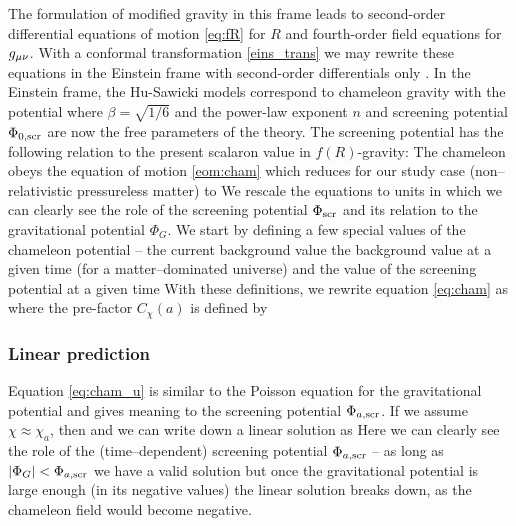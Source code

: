 The formulation of modified gravity in this frame leads to second-order differential equations of motion \eqref{eq:fR} for $R$ and fourth-order field equations for $g_{\mu\nu}$. With a conformal transformation \eqref{eins_trans} we may rewrite these equations in the Einstein frame with second-order differentials only \parencite[see, e.g.,][]{CHIBA20031}. In the Einstein frame, the Hu-Sawicki models correspond to chameleon gravity with the potential
where $\beta=\sqrt{1/6}$ and the power-law exponent $n$ and screening potential $\Phi_{0,\text{\scriptsize scr}}$ are now the free parameters of the theory. The screening potential has the following relation to the present scalaron value in $f(R)$-gravity:
The chameleon obeys the equation of motion \eqref{eom:cham} which reduces for our study case (non--relativistic pressureless matter) to
We rescale the equations to units in which we can clearly see the role of the screening potential $\Phi_{\text{\scriptsize scr}}$ and its relation to the gravitational potential $\Phi_G$. We start by defining a few special values of the chameleon potential -- the current background value
the background value at a given time (for a matter--dominated universe)
and the value of the screening potential at a given time
With these definitions, we rewrite equation \eqref{eq:cham} as
where the pre-factor $C_\chi(a)$ is defined by
\subsubsection{Linear prediction}
Equation \eqref{eq:cham_u} is similar to the Poisson equation for the gravitational potential and gives meaning to the screening potential $\Phi_{a,\text{\scriptsize scr}}$. If we assume $\chi\approx\chi_a$, then
and we can write down a linear solution as
Here we can clearly see the role of the (time--dependent) screening potential $\Phi_{a,\text{\scriptsize scr}}$ -- as long as $|\Phi_G| < \Phi_{a,\text{\scriptsize scr}}$ we have a valid solution but once the gravitational potential is large enough (in its negative values) the linear solution breaks down, as the chameleon field would become negative.

